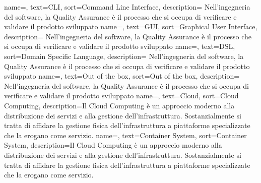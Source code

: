 {
	name=,
	text=CLI,
	sort=Command Line Interface,
	description={ Nell'ingegneria del software, la Quality Assurance è il processo che si occupa di verificare e validare il prodotto sviluppato}
}
{
	name=,
	text=GUI,
	sort=Graphical User Interface,
	description={ Nell'ingegneria del software, la Quality Assurance è il processo che si occupa di verificare e validare il prodotto sviluppato}
}
{
	name=,
	text=DSL,
	sort=Domain Specific Language,
	description={ Nell'ingegneria del software, la Quality Assurance è il processo che si occupa di verificare e validare il prodotto sviluppato}
}
{
	name=,
	text=Out of the box,
	sort=Out of the box,
	description={ Nell'ingegneria del software, la Quality Assurance è il processo che si occupa di verificare e validare il prodotto sviluppato}
}
{
	name=,
	text=Cloud,
	sort=Cloud Computing,
	description={Il Cloud Computing è un approccio moderno alla distribuzione dei servizi e alla gestione dell’infrastruttura. Sostanzialmente si tratta di affidare la gestione fisica dell’infrastruttura a piattaforme specializzate che la erogano come servizio.}
}
{
	name=,
	text=Container System,
	sort=Container System,
	description={Il Cloud Computing è un approccio moderno alla distribuzione dei servizi e alla gestione dell’infrastruttura. Sostanzialmente si tratta di affidare la gestione fisica dell’infrastruttura a piattaforme specializzate che la erogano come servizio.}
}